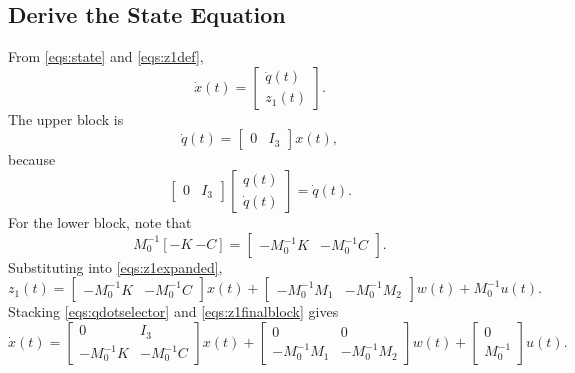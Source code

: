 \documentclass[11pt]{article}
\begin{document}
\subsection{Derive the State Equation}
From \eqref{eqs:state} and \eqref{eqs:z1def},
\begin{equation}
    \dot{x}(t)
    =
    \begin{bmatrix}
        \dot{q}(t) \\
        z_1(t)
    \end{bmatrix}.
    \label{eqs:xdotz1}
\end{equation}
The upper block is
\begin{equation}
    \dot{q}(t)
    =
    \begin{bmatrix}
        0 & I_3
    \end{bmatrix}
    x(t),
    \label{eqs:qdotselector}
\end{equation}
because
\[
\begin{bmatrix}
    0 & I_3
\end{bmatrix}
\begin{bmatrix}
    q(t) \\
    \dot{q}(t)
\end{bmatrix}
= \dot{q}(t).
\]
For the lower block, note that
\begin{equation}
    M_0^{-1}[-K\ {-C}]
    =
    \begin{bmatrix}
        -M_0^{-1}K & -M_0^{-1}C
    \end{bmatrix}.
    \label{eqs:blocksplit}
\end{equation}
Substituting into \eqref{eqs:z1expanded},
\begin{equation}
    z_1(t)
    =
    \begin{bmatrix}
        -M_0^{-1}K & -M_0^{-1}C
    \end{bmatrix}
    x(t)
    +
    \begin{bmatrix}
        -M_0^{-1}M_1 & -M_0^{-1}M_2
    \end{bmatrix}
    w(t)
    +
    M_0^{-1}u(t).
    \label{eqs:z1finalblock}
\end{equation}
Stacking \eqref{eqs:qdotselector} and \eqref{eqs:z1finalblock} gives
\begin{equation}
    \dot{x}(t)
    =
    \begin{bmatrix}
        0 & I_3 \\
        -M_0^{-1}K & -M_0^{-1}C
    \end{bmatrix}
    x(t)
    +
    \begin{bmatrix}
        0 & 0 \\
        -M_0^{-1}M_1 & -M_0^{-1}M_2
    \end{bmatrix}
    w(t)
    +
    \begin{bmatrix}
        0 \\
        M_0^{-1}
    \end{bmatrix}
    u(t).
    \label{eqs:stateblocks}
\end{equation}
\end{document}
